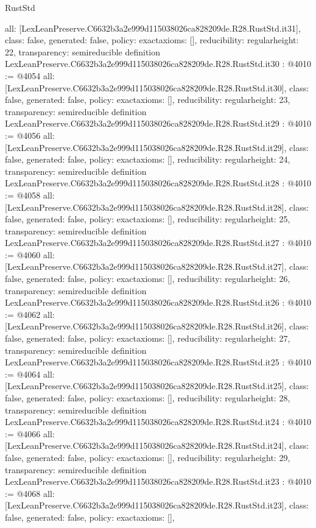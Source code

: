 \begin{lexlean}{RustStd}
\begin{coremodule}
{  all: [LexLeanPreserve.C6632b3a2e999d115038026ca828209de.R28.RustStd.it31],
  class: false,
  generated: false,
  policy: exact{axioms: []},
  reducibility: regular{height: 22},
  transparency: semireducible
}
definition LexLeanPreserve.C6632b3a2e999d115038026ca828209de.R28.RustStd.it30 : @4010 := @4054 {
  all: [LexLeanPreserve.C6632b3a2e999d115038026ca828209de.R28.RustStd.it30],
  class: false,
  generated: false,
  policy: exact{axioms: []},
  reducibility: regular{height: 23},
  transparency: semireducible
}
definition LexLeanPreserve.C6632b3a2e999d115038026ca828209de.R28.RustStd.it29 : @4010 := @4056 {
  all: [LexLeanPreserve.C6632b3a2e999d115038026ca828209de.R28.RustStd.it29],
  class: false,
  generated: false,
  policy: exact{axioms: []},
  reducibility: regular{height: 24},
  transparency: semireducible
}
definition LexLeanPreserve.C6632b3a2e999d115038026ca828209de.R28.RustStd.it28 : @4010 := @4058 {
  all: [LexLeanPreserve.C6632b3a2e999d115038026ca828209de.R28.RustStd.it28],
  class: false,
  generated: false,
  policy: exact{axioms: []},
  reducibility: regular{height: 25},
  transparency: semireducible
}
definition LexLeanPreserve.C6632b3a2e999d115038026ca828209de.R28.RustStd.it27 : @4010 := @4060 {
  all: [LexLeanPreserve.C6632b3a2e999d115038026ca828209de.R28.RustStd.it27],
  class: false,
  generated: false,
  policy: exact{axioms: []},
  reducibility: regular{height: 26},
  transparency: semireducible
}
definition LexLeanPreserve.C6632b3a2e999d115038026ca828209de.R28.RustStd.it26 : @4010 := @4062 {
  all: [LexLeanPreserve.C6632b3a2e999d115038026ca828209de.R28.RustStd.it26],
  class: false,
  generated: false,
  policy: exact{axioms: []},
  reducibility: regular{height: 27},
  transparency: semireducible
}
definition LexLeanPreserve.C6632b3a2e999d115038026ca828209de.R28.RustStd.it25 : @4010 := @4064 {
  all: [LexLeanPreserve.C6632b3a2e999d115038026ca828209de.R28.RustStd.it25],
  class: false,
  generated: false,
  policy: exact{axioms: []},
  reducibility: regular{height: 28},
  transparency: semireducible
}
definition LexLeanPreserve.C6632b3a2e999d115038026ca828209de.R28.RustStd.it24 : @4010 := @4066 {
  all: [LexLeanPreserve.C6632b3a2e999d115038026ca828209de.R28.RustStd.it24],
  class: false,
  generated: false,
  policy: exact{axioms: []},
  reducibility: regular{height: 29},
  transparency: semireducible
}
definition LexLeanPreserve.C6632b3a2e999d115038026ca828209de.R28.RustStd.it23 : @4010 := @4068 {
  all: [LexLeanPreserve.C6632b3a2e999d115038026ca828209de.R28.RustStd.it23],
  class: false,
  generated: false,
  policy: exact{axioms: []},
}
\end{coremodule}
\end{lexlean}
